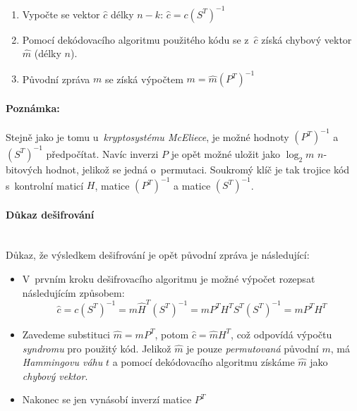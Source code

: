 \documentclass[thesis=M,czech,hidelinks]{FITthesis}[2012/06/26]
\newcommand{\0}{{\textcolor[gray]{0.80}{0}}}
\begin{document}
\begin{enumerate}
    \item Vypočte se vektor $\hat{c}$ délky $n-k$:
        $\hat{c} = c \left(S^T\right)^{-1} $
    \item Pomocí dekódovacího algoritmu použitého kódu se z~$\hat{c}$ získá
        chybový vektor $\hat{m}$ (délky $n$).
    \item Původní zpráva $m$ se získá výpočtem
        $m = \hat{m} \left(P^T\right)^{-1}$
\end{enumerate}


\paragraph{Poznámka:} Stejně jako je tomu u~\emph{kryptosystému McEliece}, je
možné hodnoty $\left(P^T\right)^{-1}$ a $\left(S^T\right)^{-1}$ předpočítat.
Navíc inverzi $P$ je opět možné uložit jako $\log_2 m$ $n$-bitových hodnot,
jelikož se jedná o~permutaci. Soukromý klíč je tak trojice kód s~kontrolní
maticí $H$, matice $\left(P^T\right)^{-1}$ a matice $\left(S^T\right)^{-1}$.


\paragraph{Důkaz dešifrování} \hfill \\
Důkaz, že výsledkem dešifrování je opět původní zpráva je následující:

\begin{itemize}
    \item V~prvním kroku dešifrovacího algoritmu je možné výpočet rozepsat
        následujícím způsobem:
        $$
            \hat{c} =   c \left(S^T\right)^{-1} =
                        m \hat{H}^T \left(S^T\right)^{-1} =
                        m P^T H^T S^T \left(S^T\right)^{-1} =
                        m P^T H^T
        $$

    \item Zavedeme substituci $\hat{m} = m P^T$, potom $\hat{c} = \hat{m} H^T$,
        což odpovídá výpočtu \emph{syndromu} pro použitý kód. Jelikož $\hat{m}$
        je pouze \emph{permutovaná} původní $m$, má \emph{Hammingovu váhu} $t$
        a pomocí dekódovacího algoritmu získáme $\hat{m}$ jako \emph{chybový
        vektor}.
    \item Nakonec se jen vynásobí inverzí matice $P^T$

\end{itemize}

\end{document}
